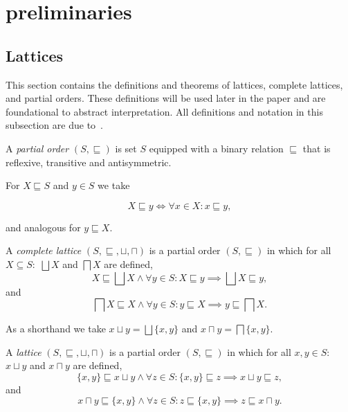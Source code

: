 
\section{preliminaries}\label{sec:preliminaries}

\subsection{Lattices}\label{subsec:lattices}
This section contains the definitions and theorems of lattices, complete lattices, and partial orders.
These definitions will be used later in the paper and are foundational to abstract interpretation.
All definitions and notation in this subsection are due to~\cite{nielson_formal_2019}.

\begin{definition}
    A \emph{partial order} $(S, \sqsubseteq)$ is set $S$ equipped with a binary relation $\sqsubseteq$ that is reflexive, transitive and antisymmetric.
\end{definition}


For $X \sqsubseteq S$ and $y \in S$ we take


\begin{equation}
    X \sqsubseteq y \iff \forall x \in X : x \sqsubseteq y,\label{eq:equation}
\end{equation}


and analogous for $y \sqsubseteq X$.


\begin{definition}
    A \emph{complete lattice} $(S, \sqsubseteq, \sqcup, \sqcap)$ is a partial order $(S, \sqsubseteq)$ in which for all $X \subseteq S:$ $\bigsqcup X$ and $\bigsqcap X$ are defined,
    \begin{equation}
        X \sqsubseteq \bigsqcup X \land \forall y \in S : X \sqsubseteq y \implies \bigsqcup X \sqsubseteq y,\label{eq:equation2}
    \end{equation}
    and
    \begin{equation}
        \bigsqcap X \sqsubseteq X \land \forall y \in S : y \sqsubseteq X \implies y \sqsubseteq \bigsqcap X.\label{eq:equation3}
    \end{equation}
\end{definition}


As a shorthand we take $x \sqcup y = \bigsqcup \{x, y\}$ and $x \sqcap y = \bigsqcap \{x, y\}$.


\begin{definition}
    A \emph{lattice} $(S, \sqsubseteq, \sqcup, \sqcap)$ is a partial order $(S, \sqsubseteq)$ in which for all $x,y \in S:$ $x \sqcup y$ and $x \sqcap y$ are defined,
    \begin{equation}
        \{x, y\} \sqsubseteq x \sqcup y \land \forall z \in S : \{x, y\} \sqsubseteq z \implies x \sqcup y \sqsubseteq z,\label{eq:equation4}
    \end{equation}
    and
    \begin{equation}
        x \sqcap y \sqsubseteq \{x, y\} \land \forall z \in S : z \sqsubseteq \{x, y\} \implies z \sqsubseteq x \sqcap y.\label{eq:equation5}
    \end{equation}
\end{definition}


